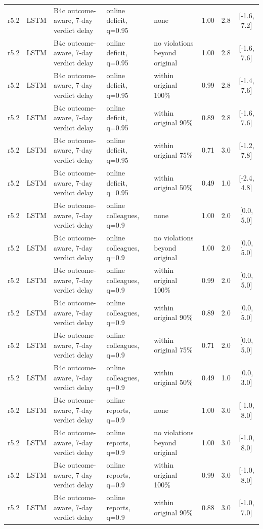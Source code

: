 \documentclass[10pt,onecolumn,letterpaper]{article}
\begin{document}
\begin{longtable}{lllp{4.2cm}p{3.4cm}ccc}
r5.2 & LSTM & B4c outcome-aware, 7-day verdict delay & online deficit, q=0.95 & none & 1.00 & 2.8 & [-1.6, 7.2] \\
r5.2 & LSTM & B4c outcome-aware, 7-day verdict delay & online deficit, q=0.95 & no violations beyond original & 1.00 & 2.8 & [-1.6, 7.6] \\
r5.2 & LSTM & B4c outcome-aware, 7-day verdict delay & online deficit, q=0.95 & within original 100\% & 0.99 & 2.8 & [-1.4, 7.6] \\
r5.2 & LSTM & B4c outcome-aware, 7-day verdict delay & online deficit, q=0.95 & within original 90\% & 0.89 & 2.8 & [-1.6, 7.6] \\
r5.2 & LSTM & B4c outcome-aware, 7-day verdict delay & online deficit, q=0.95 & within original 75\% & 0.71 & 3.0 & [-1.2, 7.8] \\
r5.2 & LSTM & B4c outcome-aware, 7-day verdict delay & online deficit, q=0.95 & within original 50\% & 0.49 & 1.0 & [-2.4, 4.8] \\
r5.2 & LSTM & B4c outcome-aware, 7-day verdict delay & online colleagues, q=0.9 & none & 1.00 & 2.0 & [0.0, 5.0] \\
r5.2 & LSTM & B4c outcome-aware, 7-day verdict delay & online colleagues, q=0.9 & no violations beyond original & 1.00 & 2.0 & [0.0, 5.0] \\
r5.2 & LSTM & B4c outcome-aware, 7-day verdict delay & online colleagues, q=0.9 & within original 100\% & 0.99 & 2.0 & [0.0, 5.0] \\
r5.2 & LSTM & B4c outcome-aware, 7-day verdict delay & online colleagues, q=0.9 & within original 90\% & 0.89 & 2.0 & [0.0, 5.0] \\
r5.2 & LSTM & B4c outcome-aware, 7-day verdict delay & online colleagues, q=0.9 & within original 75\% & 0.71 & 2.0 & [0.0, 5.0] \\
r5.2 & LSTM & B4c outcome-aware, 7-day verdict delay & online colleagues, q=0.9 & within original 50\% & 0.49 & 1.0 & [0.0, 3.0] \\
r5.2 & LSTM & B4c outcome-aware, 7-day verdict delay & online reports, q=0.9 & none & 1.00 & 3.0 & [-1.0, 8.0] \\
r5.2 & LSTM & B4c outcome-aware, 7-day verdict delay & online reports, q=0.9 & no violations beyond original & 1.00 & 3.0 & [-1.0, 8.0] \\
r5.2 & LSTM & B4c outcome-aware, 7-day verdict delay & online reports, q=0.9 & within original 100\% & 0.99 & 3.0 & [-1.0, 8.0] \\
r5.2 & LSTM & B4c outcome-aware, 7-day verdict delay & online reports, q=0.9 & within original 90\% & 0.88 & 3.0 & [-1.0, 7.0] \\

\end{longtable}
\end{document}
